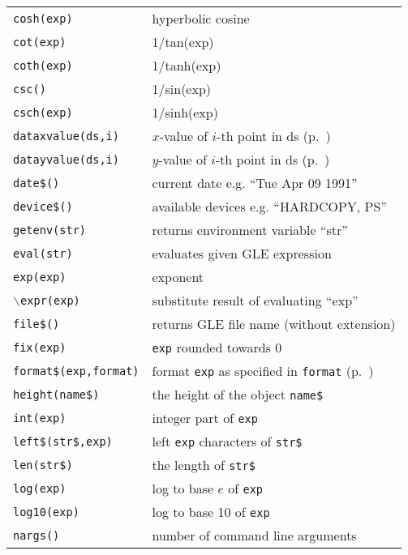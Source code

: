 \begin{supertabular}{ll}
{\tt cosh(exp)}        	& hyperbolic cosine \\
{\tt cot(exp)}          	& 1/tan(exp) \\
{\tt coth(exp)}        	& 1/tanh(exp) \\
{\tt csc()}             	& 1/sin(exp) \\
{\tt csch(exp)}        	& 1/sinh(exp) \\
{\tt dataxvalue(ds,i)}  & $x$-value of $i$-th point in ds (p.~\pageref{dataxvalue})\\
{\tt datayvalue(ds,i)}  & $y$-value of $i$-th point in ds (p.~\pageref{datayvalue})\\
{\tt date\$()}       	& current date e.g. ``Tue Apr 09 1991'' \\
{\tt device\$()}   	& available devices e.g. ``HARDCOPY, PS''\\
{\tt getenv(str)}       & returns environment variable ``str''\\
{\tt eval(str)}          	& evaluates given GLE expression \\
{\tt exp(exp)}          	& exponent \\
{\tt $\backslash{}$expr(exp)}  & substitute result of evaluating ``exp'' \\
{\tt file\$()}          & returns GLE file name (without extension) \\
{\tt fix(exp)}          	& {\tt exp} rounded towards 0 \\
{\tt format\$(exp,format)}  & format {\tt exp} as specified in {\tt format} (p.~\pageref{formatnum:pg})\\
{\tt height(name\$)}  	& the height of the object {\tt name\$} \\
{\tt int(exp)}          	& integer part of {\tt exp} \\
{\tt left\$(str\$,exp)}        & left {\tt exp} characters of {\tt str\$} \\
{\tt len(str\$)}        	& the length of {\tt str\$} \\
{\tt log(exp)}          	& log to base $e$ of {\tt exp} \\
{\tt log10(exp)}      	& log to base 10 of {\tt exp} \\
{\tt nargs()}        	& number of command line arguments \\

\end{supertabular}
